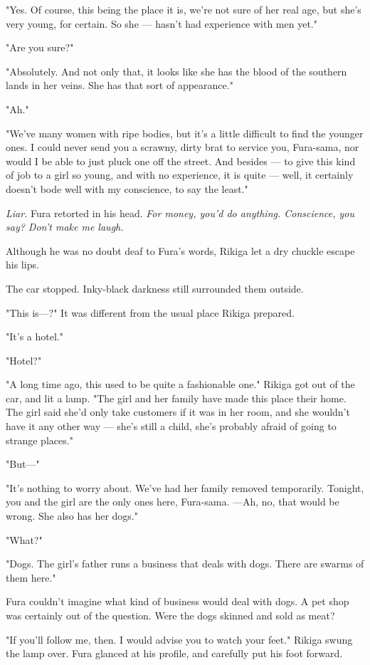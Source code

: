 "Yes. Of course, this being the place it is, we're not sure of her real
age, but she's very young, for certain. So she --- hasn't had experience
with men yet."

"Are you sure?"

"Absolutely. And not only that, it looks like she has the blood of the
southern lands in her veins. She has that sort of appearance."

"Ah."

"We've many women with ripe bodies, but it's a little difficult to find
the younger ones. I could never send you a scrawny, dirty brat to
service you, Fura-sama, nor would I be able to just pluck one off the
street. And besides --- to give this kind of job to a girl so young, and
with no experience, it is quite --- well, it certainly doesn't bode well
with my conscience, to say the least."

\emph{Liar.} Fura retorted in his head. \emph{For money, you'd do anything.
Conscience, you say? Don't make me laugh.}

Although he was no doubt deaf to Fura's words, Rikiga let a dry chuckle
escape his lips.

The car stopped. Inky-black darkness still surrounded them outside.

"This is---?" It was different from the usual place Rikiga prepared.

"It's a hotel."

"Hotel?"

"A long time ago, this used to be quite a fashionable one." Rikiga got
out of the car, and lit a lamp. "The girl and her family have made this
place their home. The girl said she'd only take customers if it was in
her room, and she wouldn't have it any other way --- she's still a child,
she's probably afraid of going to strange places."

"But---"

"It's nothing to worry about. We've had her family removed temporarily.
Tonight, you and the girl are the only ones here, Fura-sama. ---Ah, no,
that would be wrong. She also has her dogs."

"What?"

"Dogs. The girl's father runs a business that deals with dogs. There are
swarms of them here."

Fura couldn't imagine what kind of business would deal with dogs. A pet
shop was certainly out of the question. Were the dogs skinned and sold
as meat?

"If you'll follow me, then. I would advise you to watch your feet."
Rikiga swung the lamp over. Fura glanced at his profile, and carefully
put his foot forward.

